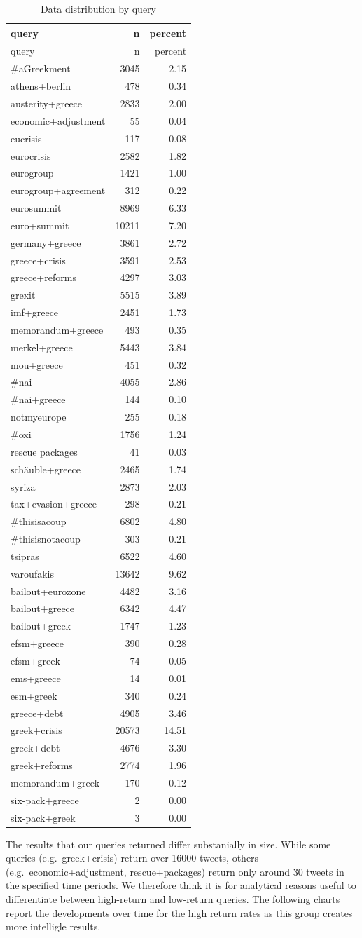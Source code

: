 \documentclass[]{article}
\begin{document}
\begin{longtable}[c]{@{}lrr@{}}
\caption{Data distribution by query}\tabularnewline
\toprule
query & n & percent\tabularnewline
\midrule
\endfirsthead
\toprule
query & n & percent\tabularnewline
\midrule
\endhead
\#aGreekment & 3045 & 2.15\tabularnewline
athens+berlin & 478 & 0.34\tabularnewline
austerity+greece & 2833 & 2.00\tabularnewline
economic+adjustment & 55 & 0.04\tabularnewline
eucrisis & 117 & 0.08\tabularnewline
eurocrisis & 2582 & 1.82\tabularnewline
eurogroup & 1421 & 1.00\tabularnewline
eurogroup+agreement & 312 & 0.22\tabularnewline
eurosummit & 8969 & 6.33\tabularnewline
euro+summit & 10211 & 7.20\tabularnewline
germany+greece & 3861 & 2.72\tabularnewline
greece+crisis & 3591 & 2.53\tabularnewline
greece+reforms & 4297 & 3.03\tabularnewline
grexit & 5515 & 3.89\tabularnewline
imf+greece & 2451 & 1.73\tabularnewline
memorandum+greece & 493 & 0.35\tabularnewline
merkel+greece & 5443 & 3.84\tabularnewline
mou+greece & 451 & 0.32\tabularnewline
\#nai & 4055 & 2.86\tabularnewline
\#nai+greece & 144 & 0.10\tabularnewline
notmyeurope & 255 & 0.18\tabularnewline
\#oxi & 1756 & 1.24\tabularnewline
rescue packages & 41 & 0.03\tabularnewline
schäuble+greece & 2465 & 1.74\tabularnewline
syriza & 2873 & 2.03\tabularnewline
tax+evasion+greece & 298 & 0.21\tabularnewline
\#thisisacoup & 6802 & 4.80\tabularnewline
\#thisisnotacoup & 303 & 0.21\tabularnewline
tsipras & 6522 & 4.60\tabularnewline
varoufakis & 13642 & 9.62\tabularnewline
bailout+eurozone & 4482 & 3.16\tabularnewline
bailout+greece & 6342 & 4.47\tabularnewline
bailout+greek & 1747 & 1.23\tabularnewline
efsm+greece & 390 & 0.28\tabularnewline
efsm+greek & 74 & 0.05\tabularnewline
ems+greece & 14 & 0.01\tabularnewline
esm+greek & 340 & 0.24\tabularnewline
greece+debt & 4905 & 3.46\tabularnewline
greek+crisis & 20573 & 14.51\tabularnewline
greek+debt & 4676 & 3.30\tabularnewline
greek+reforms & 2774 & 1.96\tabularnewline
memorandum+greek & 170 & 0.12\tabularnewline
six-pack+greece & 2 & 0.00\tabularnewline
six-pack+greek & 3 & 0.00\tabularnewline
\bottomrule
\end{longtable}

The results that our queries returned differ substanially in size. While
some queries (e.g.~greek+crisis) return over 16000 tweets, others
(e.g.~economic+adjustment, rescue+packages) return only around 30 tweets
in the specified time periods. We therefore think it is for analytical
reasons useful to differentiate between high-return and low-return
queries. The following charts report the developments over time for the
high return rates as this group creates more intelligle results.
\end{document}
